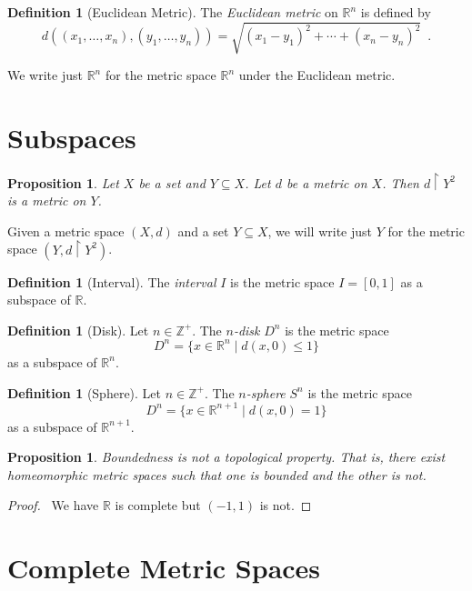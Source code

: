 \documentclass{book}
\let\qed\relax
\newtheorem{proposition}[lemma]{Proposition}
\theoremstyle{definition}
\newtheorem{definition}[lemma]{Definition}
\newcommand{\Real}{\ensuremath{\mathbb{R}}}
\begin{document}
\begin{definition}[Euclidean Metric]
    The \emph{Euclidean metric} on $\Real^n$ is defined by
    \[ d((x_1, \ldots, x_n),(y_1, \ldots, y_n)) = \sqrt{(x_1 - y_1)^2 + \cdots + (x_n - y_n)^2} \enspace . \]
\end{definition}

We write just $\Real^n$ for the metric space $\Real^n$ under the Euclidean metric.

\section{Subspaces}

\begin{proposition}
    Let $X$ be a set and $Y \subseteq X$. Let $d$ be a metric on $X$. Then $d \restriction Y^2$ is a metric on $Y$.
\end{proposition}

Given a metric space $(X,d)$ and a set $Y \subseteq X$, we will write just $Y$ for the metric space $(Y, d \restriction Y^2)$.

\begin{definition}[Interval]
    The \emph{interval} $I$ is the metric space $I = [0,1]$ as a subspace of $\Real$.
\end{definition}

\begin{definition}[Disk]
    Let $n \in \mathbb{Z}^+$. The \emph{$n$-disk} $D^n$ is the metric space
    \[ D^n = \{ x \in \Real^n \mid d(x,0) \leq 1 \} \]
    as a subspace of $\Real^n$.
\end{definition}

\begin{definition}[Sphere]
    Let $n \in \mathbb{Z}^+$. The \emph{$n$-sphere} $S^n$ is the metric space
    \[ D^n = \{ x \in \Real^{n+1} \mid d(x,0) = 1 \} \]
    as a subspace of $\Real^{n+1}$.
\end{definition}

\begin{proposition}
    Boundedness is not a topological property. That is, there exist homeomorphic metric spaces such that one is bounded and the other is
    not.
\end{proposition}

\begin{proof}
    \pf\ We have $\Real$ is complete but $(-1,1)$ is not. \qed
\end{proof}

\section{Complete Metric Spaces}
\end{document}
